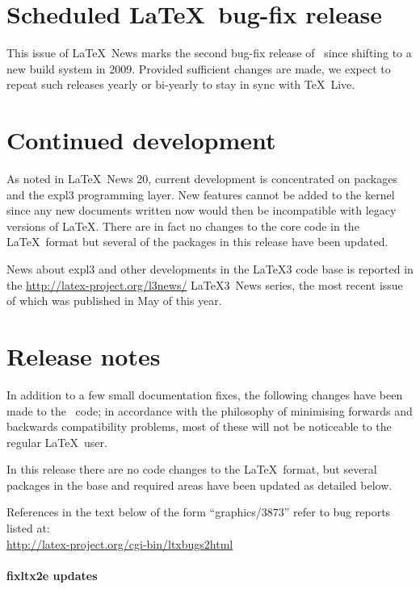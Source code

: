 \documentclass{ltnews}
\begin{document}
\maketitle

\section{Scheduled \LaTeX\ bug-fix release}

This issue of \LaTeX~News marks the second bug-fix release of
\LaTeXe\ since shifting to a new build system in 2009.
Provided sufficient changes are made, we expect to
repeat such releases yearly or bi-yearly to stay in sync with \TeX\ Live.

\section{Continued development}
As noted in \LaTeX\ News 20, current development is concentrated on
packages and the \textsf{expl3} programming layer.
New features cannot be added to the kernel since any new documents
written now would then be incompatible with legacy versions of
\LaTeX. There are in fact no changes to the core code in the \LaTeX\
format but several of the packages in this release have been updated.

News about \textsf{expl3} and other developments in the \LaTeX3 code
base is reported in the \url{http://latex-project.org/l3news/}
\LaTeX3~News series, the most recent issue of which was published in
May of this year.

\section{Release notes}

In addition to a few small documentation fixes, the following changes
have been made to the \LaTeXe\ code; in accordance with the philosophy
of minimising forwards and backwards compatibility problems, most of
these will not be noticeable to the regular \LaTeX\ user. 

In this release there are no code changes to the \LaTeX\ format, but
several packages in the base and   required areas have been updated as
detailed below.

References in the text below of the form ``graphics/3873'' refer to
bug reports listed
at:\\ \url{http://latex-project.org/cgi-bin/ltxbugs2html}


\paragraph{\textsf{fixltx2e} updates}
\end{document}
